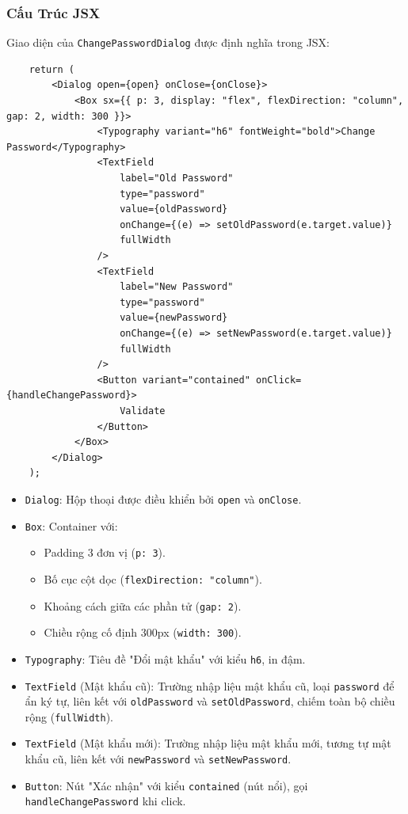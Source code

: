             \subsubsection{Cấu Trúc JSX}
                \hspace*{0.6cm}Giao diện của \texttt{ChangePasswordDialog} được định nghĩa trong JSX:
                \begin{lstlisting}
    return (
        <Dialog open={open} onClose={onClose}>
            <Box sx={{ p: 3, display: "flex", flexDirection: "column", gap: 2, width: 300 }}>
                <Typography variant="h6" fontWeight="bold">Change Password</Typography>
                <TextField
                    label="Old Password"
                    type="password"
                    value={oldPassword}
                    onChange={(e) => setOldPassword(e.target.value)}
                    fullWidth
                />
                <TextField
                    label="New Password"
                    type="password"
                    value={newPassword}
                    onChange={(e) => setNewPassword(e.target.value)}
                    fullWidth
                />
                <Button variant="contained" onClick={handleChangePassword}>
                    Validate
                </Button>
            </Box>
        </Dialog>
    );
                \end{lstlisting}
                \begin{itemize}
                    \item \texttt{Dialog}: Hộp thoại được điều khiển bởi \texttt{open} và \texttt{onClose}.
                    \item \texttt{Box}: Container với:
                    \begin{itemize}
                        \item Padding 3 đơn vị (\texttt{p: 3}).
                        \item Bố cục cột dọc (\texttt{flexDirection: "column"}).
                        \item Khoảng cách giữa các phần tử (\texttt{gap: 2}).
                        \item Chiều rộng cố định 300px (\texttt{width: 300}).
                    \end{itemize}
                    \item \texttt{Typography}: Tiêu đề "Đổi mật khẩu" với kiểu \texttt{h6}, in đậm.
                    \item \texttt{TextField} (Mật khẩu cũ): Trường nhập liệu mật khẩu cũ, loại \texttt{password} để ẩn ký tự, liên kết với \texttt{oldPassword} và \texttt{setOldPassword}, chiếm toàn bộ chiều rộng (\texttt{fullWidth}).
                    \item \texttt{TextField} (Mật khẩu mới): Trường nhập liệu mật khẩu mới, tương tự mật khẩu cũ, liên kết với \texttt{newPassword} và \texttt{setNewPassword}.
                    \item \texttt{Button}: Nút "Xác nhận" với kiểu \texttt{contained} (nút nổi), gọi \texttt{handleChangePassword} khi click.
                \end{itemize}

